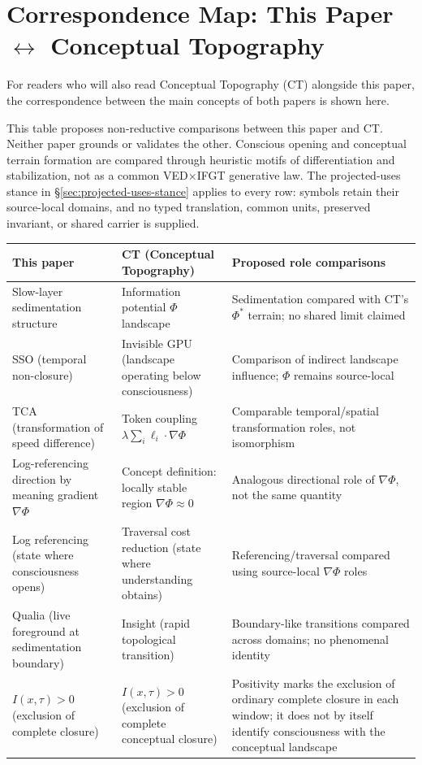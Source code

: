 \section{Correspondence Map: This Paper \texorpdfstring{$\leftrightarrow$}{<->} Conceptual Topography}


For readers who will also read Conceptual Topography (CT) alongside this paper, the correspondence between the main concepts of both papers is shown here.

This table proposes non-reductive comparisons between this paper and CT.
Neither paper grounds or validates the other. Conscious opening and
conceptual terrain formation are compared through heuristic motifs of
differentiation and stabilization, not as a common VED×IFGT generative law.
The projected-uses stance in §\ref{sec:projected-uses-stance} applies to every
row: symbols retain their source-local domains, and no typed translation,
common units, preserved invariant, or shared carrier is supplied.

\begin{table}[H]
\small
\begin{tabularx}{\textwidth}{>{\raggedright\arraybackslash}X >{\raggedright\arraybackslash}X >{\raggedright\arraybackslash}X}
\toprule
This paper & CT (Conceptual Topography) & Proposed role comparisons \\
\midrule
Slow-layer sedimentation structure & Information potential $\Phi$ landscape & Sedimentation compared with CT's $\Phi^*$ terrain; no shared limit claimed \\
SSO (temporal non-closure) & Invisible GPU (landscape operating below consciousness) & Comparison of indirect landscape influence; $\Phi$ remains source-local \\
TCA (transformation of speed difference) & Token coupling $\lambda\sum_i \ell_i \cdot \nabla\Phi$ & Comparable temporal/spatial transformation roles, not isomorphism \\
Log-referencing direction by meaning gradient $\nabla\Phi$ & Concept definition: locally stable region $\nabla\Phi\approx 0$ & Analogous directional role of $\nabla\Phi$, not the same quantity \\
Log referencing (state where consciousness opens) & Traversal cost reduction (state where understanding obtains) & Referencing/traversal compared using source-local $\nabla\Phi$ roles \\
Qualia (live foreground at sedimentation boundary) & Insight (rapid topological transition) & Boundary-like transitions compared across domains; no phenomenal identity \\
$I(x,\tau) > 0$ (exclusion of complete closure) & $I(x,\tau) > 0$ (exclusion of complete conceptual closure) & Positivity marks the exclusion of ordinary complete closure in each window; it does not by itself identify consciousness with the conceptual landscape \\
\bottomrule
\end{tabularx}
\end{table}

